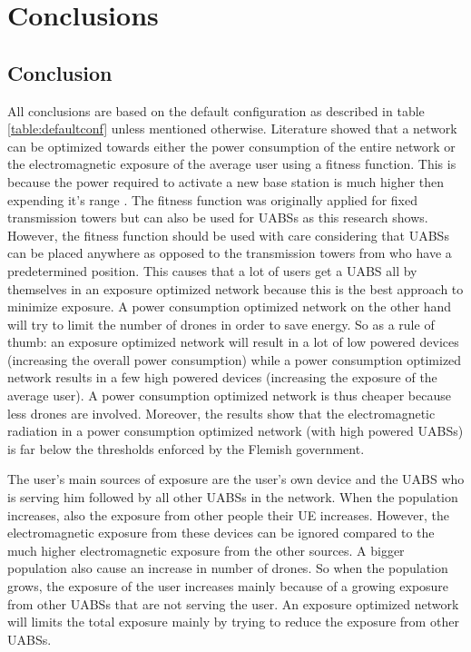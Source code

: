 \chapter{Conclusions}
\label{chap:conclusions}

\section{Conclusion}
All conclusions are based on the default configuration as described in table \ref{table:defaultconf} unless mentioned otherwise.
Literature showed that a network can be optimized towards either the power consumption of the entire network 
or the electromagnetic exposure of the average user using a fitness function. This is because the power required to activate a new 
base station is much higher then expending it's range \cite{J1}.
The fitness function was originally applied for fixed transmission towers but can also be used 
for \gls{UABS}s as this research shows.
However, the fitness function should be used with care considering that \gls{UABS}s can be placed anywhere as opposed to 
the transmission towers from \cite{J1} who have a predetermined position. This causes that a lot of users get a \gls{UABS}
all by themselves in an exposure optimized network because this is the best approach to minimize exposure.
A power consumption optimized network on the other hand will try to limit the number of drones 
in order to save energy. So as a rule of thumb: an exposure optimized network will result in a lot of low powered devices (increasing the overall power consumption)
while a power consumption optimized network results in a few high powered devices (increasing the exposure of the average user).
A power consumption optimized network is thus cheaper because less drones are involved. 
Moreover, the results show that the electromagnetic radiation in a power consumption optimized network (with high powered \gls{UABS}s)
is far below the thresholds enforced by the Flemish government.

The user's main sources of exposure are the user's own device and the \gls{UABS} who is serving him followed by all
other \gls{UABS}s in the network. 
When the population increases, also the exposure from other people their \gls{UE} increases. However, the electromagnetic
 exposure from these devices can be ignored compared to the much higher electromagnetic exposure from the other sources. 
A bigger population also cause an increase in number of drones. So when the population grows, the exposure of the 
user increases mainly because of a growing exposure from other \gls{UABS}s that are not serving the user.
An exposure optimized network will limits the total exposure mainly by trying to reduce the exposure from other \gls{UABS}s.

